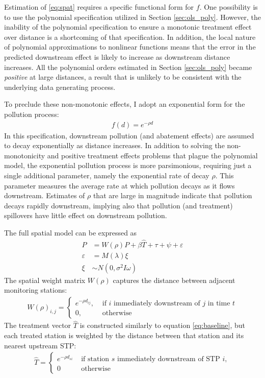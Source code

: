 \documentclass[12pt]{article}
\newcommand{\e}{\varepsilon}
\newcommand{\anum}[1]{\begin{align}#1\end{align}}
\begin{document}
Estimation of \eqref{eq:spat} requires a specific functional form for $f$. One possibility is to use the polynomial specification utilized in Section \ref{sec:ols_poly}. However, the inability of the polynomial specification to ensure a monotonic treatment effect over distance is a shortcoming of that specification. In addition, the local nature of polynomial approximations to nonlinear functions means that the error in the predicted downstream effect is likely to increase as downstream distance increases. All the polynomial orders estimated in Section \ref{sec:ols_poly} became \textit{positive} at large distances, a result that is unlikely to be consistent with the underlying data generating process. 

To preclude these non-monotonic effects, I adopt an exponential form for the pollution process:
\anum{
	f(d) = e^{-\rho d}
}
In this specification, downstream pollution (and abatement effects) are assumed to decay exponentially as distance increases. In addition to solving the non-monotonicity and positive treatment effects problems that plague the polynomial model, the exponential pollution process is more parsimonious, requiring just a single additional parameter, namely the exponential rate of decay $\rho$. This parameter measures the average rate at which pollution decays as it flows downstream. Estimates of $\rho$ that are large in magnitude indicate that pollution decays rapidly downstream, implying also that pollution (and treatment) spillovers have little effect on downstream pollution. 

The full spatial model can be expressed as 
\begin{subequations}
\anum{
	P &= W(\rho)P + \beta \widehat{T} + \tau + \psi + \e \label{eq:spat1}\\
	\e &= M(\lambda) \xi \\
	\xi &\sim N(0, \sigma^2 I \omega) \nonumber \label{eq:spat3}
}
\end{subequations}
The spatial weight matrix $W(\rho)$ captures the distance between adjacent monitoring stations:
\anum{
	W(\rho)_{i,j} = \begin{cases} e^{-\rho d_{ij}}, &\text{ if $i$ immediately downstream of $j$ in time $t$} \\ 0, &\text{ otherwise} \end{cases}
}
The treatment vector $\widehat{T}$ is constructed similarly to equation \eqref{eq:baseline}, but each treated station is weighted by the distance between that station and its nearest upstream STP:
\anum{
	\widehat{T} = \begin{cases} e^{-\rho d_{s i}} &\text{ if station $s$ immediately downstream of STP $i$}, \\ 0 &\text{ otherwise} \end{cases} 
}
\end{document}

